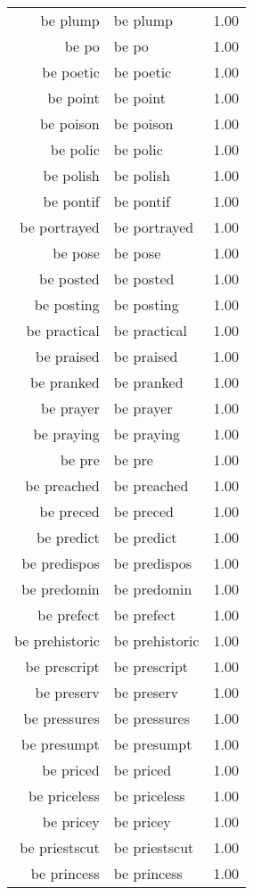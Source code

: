 \begin{table}[ht]
\begin{tabular}{rlr}
  be plump & be plump & 1.00 \\ 
  be po & be po & 1.00 \\ 
  be poetic & be poetic & 1.00 \\ 
  be point & be point & 1.00 \\ 
  be poison & be poison & 1.00 \\ 
  be polic & be polic & 1.00 \\ 
  be polish & be polish & 1.00 \\ 
  be pontif & be pontif & 1.00 \\ 
  be portrayed & be portrayed & 1.00 \\ 
  be pose & be pose & 1.00 \\ 
  be posted & be posted & 1.00 \\ 
  be posting & be posting & 1.00 \\ 
  be practical & be practical & 1.00 \\ 
  be praised & be praised & 1.00 \\ 
  be pranked & be pranked & 1.00 \\ 
  be prayer & be prayer & 1.00 \\ 
  be praying & be praying & 1.00 \\ 
  be pre & be pre & 1.00 \\ 
  be preached & be preached & 1.00 \\ 
  be preced & be preced & 1.00 \\ 
  be predict & be predict & 1.00 \\ 
  be predispos & be predispos & 1.00 \\ 
  be predomin & be predomin & 1.00 \\ 
  be prefect & be prefect & 1.00 \\ 
  be prehistoric & be prehistoric & 1.00 \\ 
  be prescript & be prescript & 1.00 \\ 
  be preserv & be preserv & 1.00 \\ 
  be pressures & be pressures & 1.00 \\ 
  be presumpt & be presumpt & 1.00 \\ 
  be priced & be priced & 1.00 \\ 
  be priceless & be priceless & 1.00 \\ 
  be pricey & be pricey & 1.00 \\ 
  be priestscut & be priestscut & 1.00 \\ 
  be princess & be princess & 1.00 \\ 

\end{tabular}
\end{table}
